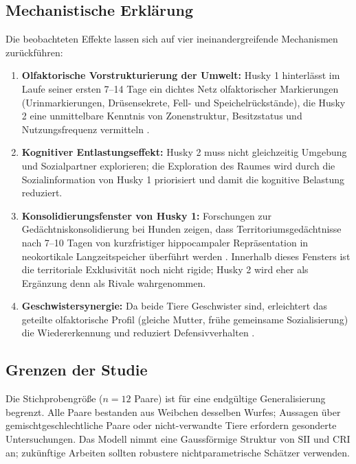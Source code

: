 ﻿\documentclass[12pt, a4paper]{article}
\theoremstyle{plain}
\theoremstyle{definition}
\theoremstyle{remark}
\newcommand{\SII}{\mathrm{SII}}
\newcommand{\CRI}{\mathrm{CRI}}
\begin{document}
\subsection{Mechanistische Erklärung}

Die beobachteten Effekte lassen sich auf vier ineinandergreifende
Mechanismen zurückführen:

\begin{enumerate}[leftmargin=*, label=(\arabic*)]
  \item \textbf{Olfaktorische Vorstrukturierung der Umwelt:} Husky 1 hinterlässt
    im Laufe seiner ersten 7--14 Tage ein dichtes Netz olfaktorischer Markierungen
    (Urinmarkierungen, Drüsensekrete, Fell- und Speichelrückstände), die Husky 2
    eine unmittelbare Kenntnis von Zonenstruktur, Besitzstatus und
    Nutzungsfrequenz vermitteln \cite{wyatt2003pheromones}.

  \item \textbf{Kognitiver Entlastungseffekt:} Husky 2 muss nicht gleichzeitig
    Umgebung und Sozialpartner explorieren; die Exploration des Raumes wird
    durch die Sozialinformation von Husky 1 priorisiert und damit die
    kognitive Belastung reduziert.

  \item \textbf{Konsolidierungsfenster von Husky 1:} Forschungen zur Gedächtniskonsolidierung
    bei Hunden zeigen, dass Territoriumsgedächtnisse nach 7--10 Tagen von
    kurzfristiger hippocampaler Repräsentation in neokortikale Langzeitspeicher
    überführt werden \cite{miklosi2007dog}. Innerhalb dieses Fensters ist die
    territoriale Exklusivität noch nicht rigide; Husky 2 wird eher als Ergänzung
    denn als Rivale wahrgenommen.

  \item \textbf{Geschwistersynergie:} Da beide Tiere Geschwister sind, erleichtert
    das geteilte olfaktorische Profil (gleiche Mutter, frühe gemeinsame
    Sozialisierung) die Wiedererkennung und reduziert Defensivverhalten
    \cite{pal2005pup}.
\end{enumerate}

\subsection{Grenzen der Studie}

Die Stichprobengröße ($n = 12$ Paare) ist für eine endgültige Generalisierung
begrenzt. Alle Paare bestanden aus Weibchen desselben Wurfes; Aussagen über
gemischtgeschlechtliche Paare oder nicht-verwandte Tiere erfordern gesonderte
Untersuchungen. Das Modell nimmt eine Gaussförmige Struktur von $\SII$ und
$\CRI$ an; zukünftige Arbeiten sollten robustere nichtparametrische Schätzer
verwenden.
\end{document}
